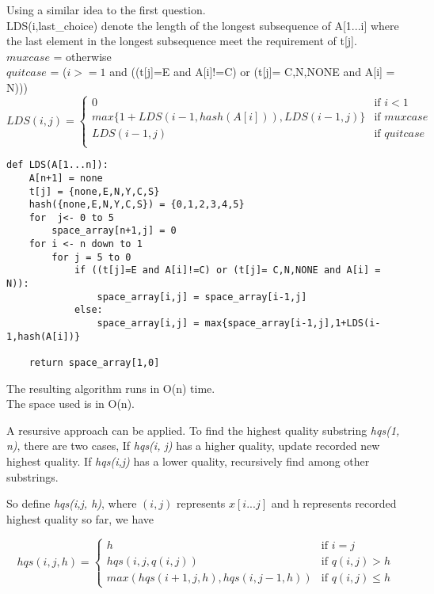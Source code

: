 \documentclass[12pt,a4paper]{article}
\newcommand{\question}[1]{\bigskip\noindent{\textbf{Q{#1} solution}}}
\begin{document}
\question{16.B}
Using a similar idea to the first question.\\
LDS(i,last\_choice) denote the length of the longest subsequence of A[1...i] where the last  element in the longest subsequence meet the requirement of t[j].
\\$muxcase$ =  otherwise
\\$quitcase$ = ($i>=1$ and ((t[j]=E and A[i]!=C) or (t[j]= C,N,NONE and A[i] = N)))
\begin{equation*}
LDS(i,j) = 
  \begin{cases}
    0 & \mbox{if } i < 1 \\
    max\{1+LDS(i-1,hash(A[i])),LDS(i-1,j)\} & \mbox{if }  mux case \\
    LDS(i-1,j) & \mbox{if }    quit case \\
  \end{cases}
\end{equation*}
\begin{lstlisting}
def LDS(A[1...n]):
	A[n+1] = none
	t[j] = {none,E,N,Y,C,S}
	hash({none,E,N,Y,C,S}) = {0,1,2,3,4,5}
	for  j<- 0 to 5
		space_array[n+1,j] = 0
	for i <- n down to 1
		for j = 5 to 0
			if ((t[j]=E and A[i]!=C) or (t[j]= C,N,NONE and A[i] = N)):
				space_array[i,j] = space_array[i-1,j]
			else:
				space_array[i,j] = max{space_array[i-1,j],1+LDS(i-1,hash(A[i])}
	
	return space_array[1,0]	
\end{lstlisting}
The resulting algorithm runs in O(n) time.\\
The space used is in O(n).\\


\question{17.A}

A resursive approach can be applied. To find the highest quality substring {\em hqs(1, n)}, there are two cases, If {\em hqs(i, j)} has a higher quality, update recorded new highest quality. If {\em hqs(i,j)} has a lower quality, recursively find among other substrings.

So define {\em hqs(i,j, h)}, where $(i,j)$ represents $x[i...j]$ and h represents recorded highest quality so far, we have

\begin{equation*}
hqs(i,j,h) = 
  \begin{cases}
    h & \mbox{if } i = j \\
    hqs(i, j, q(i, j)) & \mbox{if } q(i, j) > h \\
    max(hqs(i + 1, j, h), hqs(i, j - 1, h)) & \mbox{if } q(i,j) \le h
  \end{cases}
\end{equation*}
\end{document}
